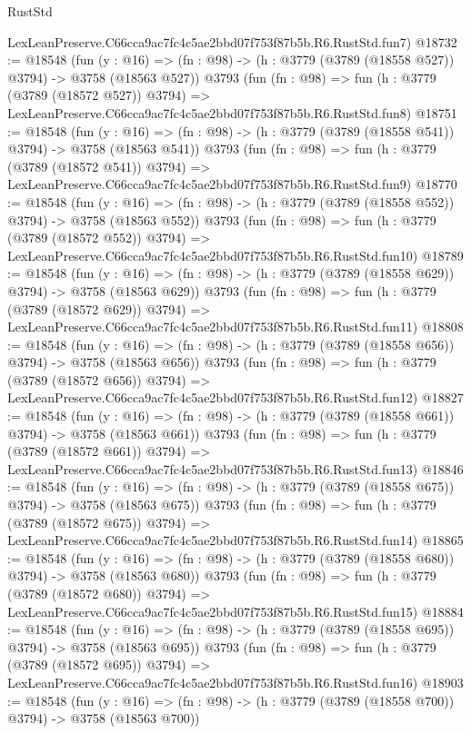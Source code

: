 \begin{lexlean}{RustStd}
\begin{coremodule}
    LexLeanPreserve.C66cca9ac7fc4c5ae2bbd07f753f87b5b.R6.RustStd.fun7)
@18732 := @18548
    (fun (y : @16) => (fn : @98) -> (h : @3779 (@3789 (@18558 @527)) @3794) -> @3758 (@18563 @527))
    @3793
    (fun (fn : @98) =>
    fun (h : @3779 (@3789 (@18572 @527)) @3794) =>
    LexLeanPreserve.C66cca9ac7fc4c5ae2bbd07f753f87b5b.R6.RustStd.fun8)
@18751 := @18548
    (fun (y : @16) => (fn : @98) -> (h : @3779 (@3789 (@18558 @541)) @3794) -> @3758 (@18563 @541))
    @3793
    (fun (fn : @98) =>
    fun (h : @3779 (@3789 (@18572 @541)) @3794) =>
    LexLeanPreserve.C66cca9ac7fc4c5ae2bbd07f753f87b5b.R6.RustStd.fun9)
@18770 := @18548
    (fun (y : @16) => (fn : @98) -> (h : @3779 (@3789 (@18558 @552)) @3794) -> @3758 (@18563 @552))
    @3793
    (fun (fn : @98) =>
    fun (h : @3779 (@3789 (@18572 @552)) @3794) =>
    LexLeanPreserve.C66cca9ac7fc4c5ae2bbd07f753f87b5b.R6.RustStd.fun10)
@18789 := @18548
    (fun (y : @16) => (fn : @98) -> (h : @3779 (@3789 (@18558 @629)) @3794) -> @3758 (@18563 @629))
    @3793
    (fun (fn : @98) =>
    fun (h : @3779 (@3789 (@18572 @629)) @3794) =>
    LexLeanPreserve.C66cca9ac7fc4c5ae2bbd07f753f87b5b.R6.RustStd.fun11)
@18808 := @18548
    (fun (y : @16) => (fn : @98) -> (h : @3779 (@3789 (@18558 @656)) @3794) -> @3758 (@18563 @656))
    @3793
    (fun (fn : @98) =>
    fun (h : @3779 (@3789 (@18572 @656)) @3794) =>
    LexLeanPreserve.C66cca9ac7fc4c5ae2bbd07f753f87b5b.R6.RustStd.fun12)
@18827 := @18548
    (fun (y : @16) => (fn : @98) -> (h : @3779 (@3789 (@18558 @661)) @3794) -> @3758 (@18563 @661))
    @3793
    (fun (fn : @98) =>
    fun (h : @3779 (@3789 (@18572 @661)) @3794) =>
    LexLeanPreserve.C66cca9ac7fc4c5ae2bbd07f753f87b5b.R6.RustStd.fun13)
@18846 := @18548
    (fun (y : @16) => (fn : @98) -> (h : @3779 (@3789 (@18558 @675)) @3794) -> @3758 (@18563 @675))
    @3793
    (fun (fn : @98) =>
    fun (h : @3779 (@3789 (@18572 @675)) @3794) =>
    LexLeanPreserve.C66cca9ac7fc4c5ae2bbd07f753f87b5b.R6.RustStd.fun14)
@18865 := @18548
    (fun (y : @16) => (fn : @98) -> (h : @3779 (@3789 (@18558 @680)) @3794) -> @3758 (@18563 @680))
    @3793
    (fun (fn : @98) =>
    fun (h : @3779 (@3789 (@18572 @680)) @3794) =>
    LexLeanPreserve.C66cca9ac7fc4c5ae2bbd07f753f87b5b.R6.RustStd.fun15)
@18884 := @18548
    (fun (y : @16) => (fn : @98) -> (h : @3779 (@3789 (@18558 @695)) @3794) -> @3758 (@18563 @695))
    @3793
    (fun (fn : @98) =>
    fun (h : @3779 (@3789 (@18572 @695)) @3794) =>
    LexLeanPreserve.C66cca9ac7fc4c5ae2bbd07f753f87b5b.R6.RustStd.fun16)
@18903 := @18548
    (fun (y : @16) => (fn : @98) -> (h : @3779 (@3789 (@18558 @700)) @3794) -> @3758 (@18563 @700))

\end{coremodule}
\end{lexlean}
